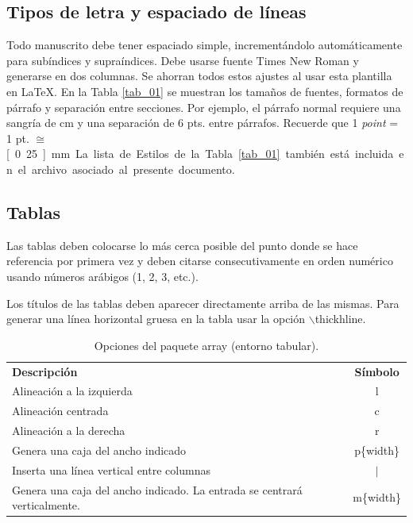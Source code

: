 \documentclass{analesafa}
\begin{document}
\subsection{Tipos de letra y espaciado de líneas}

Todo manuscrito debe tener espaciado simple, incrementándolo automáticamente para subíndices y supraíndices. Debe usarse fuente Times New Roman y generarse en dos columnas. Se ahorran todos estos ajustes al usar esta plantilla en \LaTeX.
En la Tabla \ref{tab_01} se muestran los tamaños de fuentes, formatos de párrafo y separación entre secciones. Por ejemplo, el párrafo normal requiere una sangría de \unit[1]{cm} y una separación de 6 pts. entre párrafos. Recuerde que 1 \emph{point} = 1 pt. $\cong$ \unit[0.25]{mm}. La lista de Estilos de la Tabla \ref{tab_01} también está incluida en el archivo asociado al presente documento.

\subsection{Tablas}

Las tablas deben colocarse lo más cerca posible del punto donde se hace referencia por primera vez y deben citarse consecutivamente en orden numérico usando números arábigos (1, 2, 3, etc.). 

Los títulos de las tablas deben aparecer directamente arriba de las mismas.  Para generar una línea horizontal gruesa en la tabla usar la opción \color{Blue}\textsf{$\backslash$thickhline}\color{Black}. 

\begin{table}[ht]
\caption{ Opciones del paquete \textsf{array} (entorno \textsf{tabular}).}
\label{tab_02}
    \centering
    \small           %
    \begin{tabular}{|m{5.5cm}|c|}
    \hline
    \centering
    \textbf{Descripción} & \textbf{Símbolo}  \\ 
    \thickhline
    Alineación a la izquierda & l  \\ 
    \hline
    Alineación centrada & c  \\ 
    \hline
    Alineación a la derecha & r \\
    \hline
    Genera una caja del ancho indicado & p\{width\} \\
    \hline
    Inserta una línea vertical entre columnas & $\mid$ \\
    \hline
    Genera una caja del ancho indicado. La entrada se centrará verticalmente.  &  m\{width\}  \\
    \hline
    \end{tabular}
\end{table}
\end{document}
